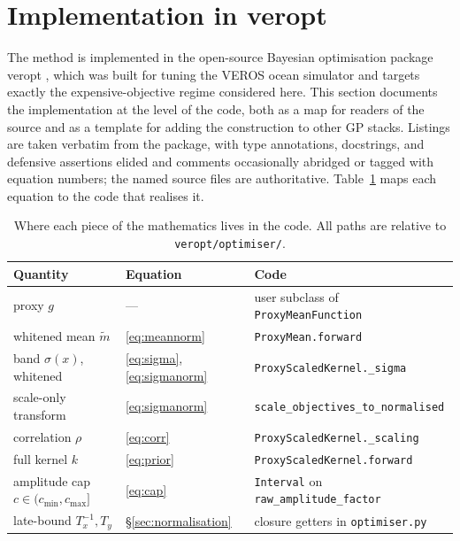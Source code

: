 \documentclass[11pt,a4paper]{article}
\newcommand{\veropt}{\textsf{veropt}}
\newcommand{\code}[1]{\texttt{#1}}
\begin{document}
\section{Implementation in \veropt{}}
\label{sec:implementation}

The method is implemented in the open-source Bayesian optimisation package
\veropt{} \citep{veropt}, which was built for tuning the VEROS ocean simulator
\citep{hafner2018} and targets exactly the expensive-objective regime
considered here. This section documents the implementation at the level of
the code, both as a map for readers of the source and as a template for
adding the construction to other GP stacks. Listings are taken verbatim from
the package, with type annotations, docstrings, and defensive assertions
elided and comments occasionally abridged or tagged with equation numbers;
the named source files are authoritative.
Table~\ref{tab:mathtocode} maps each equation to the code that realises it.

\begin{table}[t]
  \centering
  \caption{Where each piece of the mathematics lives in the code. All paths
  are relative to \code{veropt/optimiser/}.}
  \label{tab:mathtocode}
  \small
  \begin{tabular}{lll}
    \toprule
    Quantity & Equation & Code \\
    \midrule
    proxy $g$ & --- & user subclass of \code{ProxyMeanFunction} \\
    whitened mean $\tilde m$ & \eqref{eq:meannorm} & \code{ProxyMean.forward} \\
    band $\sigma(x)$, whitened & \eqref{eq:sigma}, \eqref{eq:sigmanorm} & \code{ProxyScaledKernel.\_sigma} \\
    scale-only transform & \eqref{eq:sigmanorm} & \code{scale\_objectives\_to\_normalised} \\
    correlation $\rho$ & \eqref{eq:corr} & \code{ProxyScaledKernel.\_scaling} \\
    full kernel $k$ & \eqref{eq:prior} & \code{ProxyScaledKernel.forward} \\
    amplitude cap $c \in (c_{\min}, c_{\max}]$ & \eqref{eq:cap} & \code{Interval} on \code{raw\_amplitude\_factor} \\
    late-bound $T_x^{-1}, T_y$ & \S\ref{sec:normalisation} & closure getters in \code{optimiser.py} \\
    \bottomrule
  \end{tabular}
\end{table}
\end{document}
